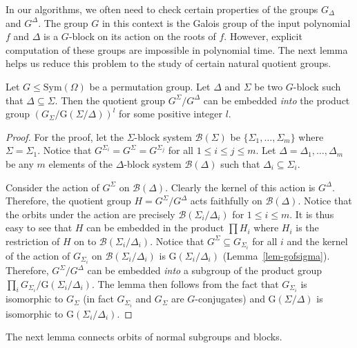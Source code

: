 \documentclass[prodmod,acmtalg]{acmsmall}
\newcommand{\Blocks}[1]{{\ensuremath{\mathcal{B}\left(#1\right)}}}
\newcommand{\Gof}[1]{{\ensuremath{\mathrm{G}\left(\scriptstyle #1\right)}}}
\newcommand{\Sym}[1]{{\ensuremath{\mathrm{Sym}\left(#1\right)}}}
\begin{document}
In our algorithms, we often need to check certain properties of the
groups $G_\Delta$ and $G^\Delta$. The group $G$ in this context is the
Galois group of the input polynomial $f$ and $\Delta$ is a $G$-block
on its action on the roots of $f$. However, explicit computation of
these groups are impossible in polynomial time. The next lemma helps
us reduce this problem to the study of certain natural quotient
groups.


\begin{lemma}\label{lem-gsupdelta}
  Let $G\leq\Sym{\Omega}$ be a permutation group. Let $\Delta$ and
  $\Sigma$ be two $G$-block such that $\Delta \subseteq \Sigma$. Then
  the quotient group $G^\Sigma/G^\Delta$ can be embedded \emph{into}
  the product group $\left( G_\Sigma/\Gof{\Sigma/\Delta}\right)^l$ for
  some positive integer $l$.
\end{lemma}
\begin{proof}

  For the proof, let the $\Sigma$-block system $\Blocks{\Sigma}$ be
  $\{\Sigma_1,\ldots,\Sigma_m\}$ where $\Sigma = \Sigma_1$. Notice
  that $G^{\Sigma_i} = G^{\Sigma} = G^{\Sigma_j}$ for all $1 \leq i
  \leq j \leq m$. Let $\Delta=\Delta_1,\ldots,\Delta_m$ be any $m$
  elements of the $\Delta$-block system $\Blocks{\Delta}$ such that
  $\Delta_i \subseteq \Sigma_i$.

  Consider the action of $G^\Sigma$ on $\Blocks{\Delta}$.  Clearly the
  kernel of this action is $G^\Delta$. Therefore, the quotient group
  $H=G^\Sigma/G^\Delta$ acts faithfully on $\Blocks{\Delta}$. Notice
  that the orbits under the action are precisely
  $\Blocks{\Sigma_i/\Delta_i}$ for $1 \leq i \leq m$. It is thus easy
  to see that $H$ can be embedded in the product $\prod H_i$ where
  $H_i$ is the restriction of $H$ on to
  $\Blocks{\Sigma_i/\Delta_i}$. Notice that $G^\Sigma \subseteq
  G_{\Sigma_i}$ for all $i$ and the kernel of the action of
  $G_{\Sigma_i}$ on $\Blocks{\Sigma_i/\Delta_i}$ is
  $\Gof{\Sigma_i/\Delta_i}$ (Lemma~\ref{lem-gofsigma}). Therefore,
  $G^\Sigma/G^\Delta$ can be embedded \emph{into} a subgroup of
  the product group $\prod_i
  G_{\Sigma_i}/\Gof{\Sigma_i/\Delta_i}$. The lemma then follows from
  the fact that $G_{\Sigma_i}$ is isomorphic to $G_\Sigma$ (in fact
  $G_{\Sigma_i}$ and $G_\Sigma$ are $G$-conjugates) and
  $\Gof{\Sigma/\Delta}$ is isomorphic to $\Gof{\Sigma_i/\Delta_i}$.

\end{proof}

The next lemma connects orbits of normal subgroups and blocks.
\end{document}
